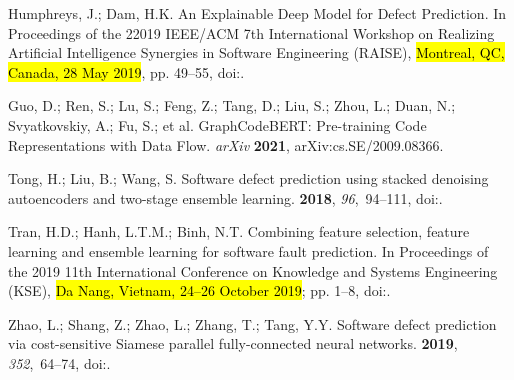 \documentclass[mathematics,review,accept,moreauthors,pdftex]{Definitions/mdpi}
\begin{document}
\begin{thebibliography}{999}
Humphreys, J.; Dam, H.K.
\newblock An Explainable Deep Model for Defect Prediction.
\newblock  In Proceedings of the 22019 IEEE/ACM 7th International Workshop on Realizing Artificial Intelligence Synergies in Software Engineering (RAISE), \hl{Montreal, QC, Canada, 28 May 2019}, pp. 49--55,
\newblock
  doi:{\href{https://doi.org/10.1109/RAISE.2019.00016}{}}.

Guo, D.; Ren, S.; Lu, S.; Feng, Z.; Tang, D.; Liu, S.; Zhou, L.; Duan, N.;
  Svyatkovskiy, A.; Fu, S.; et al.
\newblock GraphCodeBERT: Pre-training Code Representations with Data Flow.
\emph{arXiv} \textbf{2021},  arXiv:cs.SE/2009.08366.

Tong, H.; Liu, B.; Wang, S.
\newblock Software defect prediction using stacked denoising autoencoders and
  two-stage ensemble learning.
 {\bf 2018}, {\em
  96},~94--111,
\newblock
  doi:{\href{https://doi.org/https://doi.org/10.1016/j.infsof.2017.11.008}{}}.

{Tran}, H.D.; {Hanh}, L.T.M.; {Binh}, N.T.
\newblock Combining feature selection, feature learning and ensemble learning
  for software fault prediction.
\newblock  In Proceedings of the 2019 11th International Conference on Knowledge and Systems
  Engineering (KSE), \hl{Da Nang, Vietnam, 24--26 October 2019}; pp. 1--8,
\newblock
  doi:{\href{https://doi.org/10.1109/KSE.2019.8919292}{}}.

Zhao, L.; Shang, Z.; Zhao, L.; Zhang, T.; Tang, Y.Y.
\newblock Software defect prediction via cost-sensitive Siamese parallel
  fully-connected neural networks.
 {\bf 2019}, {\em 352},~64--74,
\newblock
  doi:{\href{https://doi.org/https://doi.org/10.1016/j.neucom.2019.03.076}{}}.


\end{thebibliography}
\end{document}
